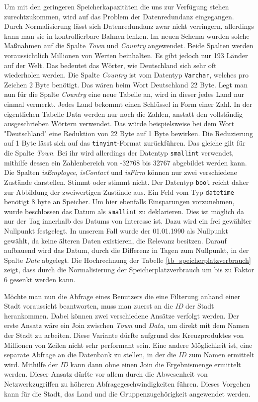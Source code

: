 Um mit den geringeren Speicherkapazitäten die uns zur Verfügung stehen zurechtzukommen, wird auf das Problem der Datenredundanz eingegangen. Durch Normalisierung lässt sich Datenredundanz zwar nicht verringern, allerdings kann man sie in kontrollierbare Bahnen lenken. Im neuen Schema wurden solche Maßnahmen auf die Spalte \textit{Town} und \textit{Country} angewendet. Beide Spalten werden voraussichtlich Millionen von Werten beinhalten. Es gibt jedoch nur 193 Länder auf der Welt. Das bedeutet das Wörter, wie Deutschland sich sehr oft wiederholen werden. Die Spalte \textit{Country} ist vom Datentyp \texttt{Varchar}, welches pro Zeichen 2 Byte benötigt. Das wären beim Wort Deutschland 22 Byte. Legt man nun für die Spalte \textit{Country} eine neue Tabelle an, wird in dieser jedes Land nur einmal vermerkt. Jedes Land bekommt einen Schlüssel in Form einer Zahl. In der eigentlichen Tabelle Data werden nur noch die Zahlen, anstatt den vollständig ausgeschrieben Wörtern verwendet. Das würde beispielsweise bei dem Wort "Deutschland" eine Reduktion von 22 Byte auf 1 Byte bewirken. Die Reduzierung auf 1 Byte lässt sich auf das \texttt{tinyint}-Format zurückführen. Das gleiche gilt für die Spalte \textit{Town}. Bei ihr wird allerdings der Datentyp \texttt{smallint} verwendet, mithilfe dessen ein Zahlenbereich von -32768 bis 32767 abgebildet werden kann. Die Spalten \textit{isEmployee}, \textit{isContact} und \textit{isFirm} können nur zwei verschiedene Zustände darstellen. Stimmt oder stimmt nicht. Der Datentyp \texttt{bool} reicht daher zur Abbildung der zweiwertigen Zustände aus. Ein Feld vom Typ \texttt{datetime} benötigt 8 byte an Speicher. Um hier ebenfalls Einsparungen vorzunehmen, wurde beschlossen das Datum als \texttt{smallint} zu deklarieren. Dies ist möglich da nur der Tag innerhalb des Datums von Interesse ist. Dazu wird ein frei gewählter Nullpunkt festgelegt. In unserem Fall wurde der 01.01.1990 als Nullpunkt gewählt, da keine älteren Daten existieren, die Relevanz besitzen. Darauf aufbauend wird das Datum, durch die Differenz in Tagen zum Nullpunkt, in der Spalte \textit{Date} abgelegt. Die Hochrechnung der Tabelle \ref{tb_speicherplatzverbrauch} zeigt, dass durch die Normalisierung der Speicherplatzverbrauch um bis zu Faktor 6 gesenkt werden kann.


Möchte man nun die Abfrage eines Benutzers die eine Filterung anhand einer Stadt voraussieht beantworten, muss man zuerst an die \textit{ID} der Stadt herankommen. Dabei können zwei verschiedene Ansätze verfolgt werden. Der erste Ansatz wäre ein Join zwischen \textit{Town} und \textit{Data}, um direkt mit dem Namen der Stadt zu arbeiten. Diese Variante dürfte aufgrund des Kreuzproduktes von Millionen von Zeilen nicht sehr performant sein. Eine andere Möglichkeit ist, eine separate Abfrage an die Datenbank zu stellen, in der die \textit{ID} zum Namen ermittelt wird. Mithilfe der \textit{ID} kann dann ohne einen Join die Ergebnismenge ermittelt werden. Dieser Ansatz dürfte vor allem durch die Abwesenheit von Netzwerkzugriffen zu höheren Abfragegeschwindigkeiten führen. Dieses Vorgehen kann für die Stadt, das Land und die Gruppenzugehörigkeit angewendet werden.

